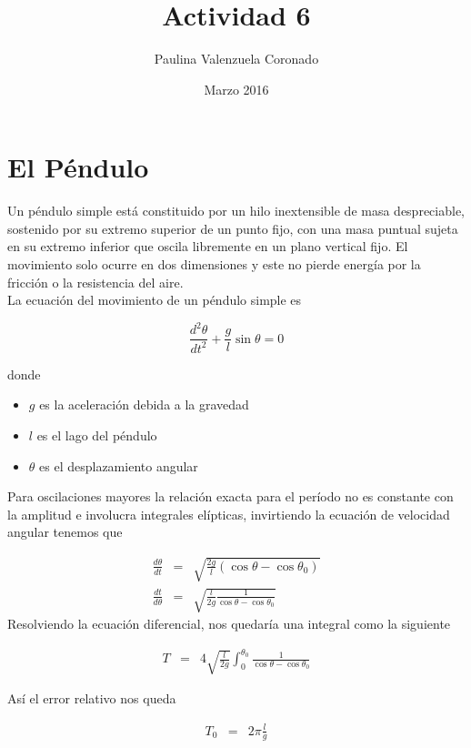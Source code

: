 \documentclass[12pt]{article}
\title{Actividad 6}
\author{Paulina Valenzuela Coronado}
\date{Marzo 2016}
\begin{document}
\maketitle

\section{El Péndulo}

Un péndulo simple está constituido por un hilo inextensible de masa despreciable, sostenido por su extremo superior de un punto fijo, con una masa puntual sujeta en su extremo inferior que oscila libremente en un plano vertical fijo.
El movimiento solo ocurre en dos dimensiones y este no pierde energía por la fricción o la resistencia del aire.\cite{Wiki} \\

La ecuación del movimiento de un péndulo simple es 

\begin{equation}
\frac{
d^2\theta}{dt^2}+\frac{g}{l}\sin\theta=0
\end{equation}

donde
\begin{itemize}
\item $g$ es la aceleración debida a la gravedad
\item $l$ es el lago del péndulo
\item $\theta$ es el desplazamiento angular 
\end{itemize}


Para oscilaciones mayores la relación exacta para el período no es constante con la amplitud e involucra integrales elípticas, invirtiendo la ecuación de velocidad angular tenemos que 

\begin{eqnarray}
\nonumber \frac{d\theta}{dt} & = & \sqrt{\frac{2g}{l}(\cos\theta-\cos\theta_0)}\\
\nonumber \frac{dt}{d\theta} & = & \sqrt{\frac{l}{2g}\frac{1}{\cos\theta-\cos\theta_0}}
\end{eqnarray}
Resolviendo la ecuación diferencial, nos quedaría una integral como la siguiente

\begin{eqnarray}
T & = & 4 \sqrt{\frac{l}{2g}}\int_{0}^{\theta_0} \frac{1}{\cos\theta-\cos\theta_0}
\end{eqnarray}

Así el error relativo nos queda

\begin{eqnarray}
\nonumber T_0 & = & 2\pi\frac{l}{g}
\end{eqnarray}
\end{document}

